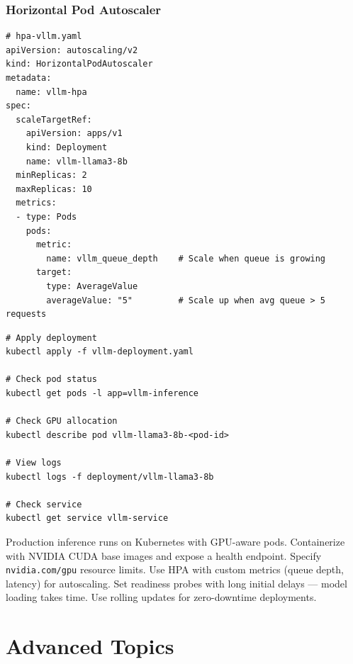 \documentclass[11pt, twoside, openright]{book}
\newenvironment{chapsummary}
  {\begin{tcolorbox}[enhanced, breakable,
    colback={rgb,255:red,245;green,245;blue,225},
    colframe=AccentOrange, boxrule=1.5pt, arc=4pt,
    title={\bfseries Chapter Summary},
    fonttitle=\bfseries\color{white},
    attach boxed title to top left={yshift=-2mm, xshift=5mm},
    boxed title style={colback=AccentOrange, arc=2pt}]}
  {\end{tcolorbox}}
\begin{document}
\section{Horizontal Pod Autoscaler}

\begin{lstlisting}[style=yamlstyle, caption={HPA based on custom latency metric}]
# hpa-vllm.yaml
apiVersion: autoscaling/v2
kind: HorizontalPodAutoscaler
metadata:
  name: vllm-hpa
spec:
  scaleTargetRef:
    apiVersion: apps/v1
    kind: Deployment
    name: vllm-llama3-8b
  minReplicas: 2
  maxReplicas: 10
  metrics:
  - type: Pods
    pods:
      metric:
        name: vllm_queue_depth    # Scale when queue is growing
      target:
        type: AverageValue
        averageValue: "5"         # Scale up when avg queue > 5 requests
\end{lstlisting}

\begin{lstlisting}[style=bashstyle, caption={Deploying to Kubernetes}]
# Apply deployment
kubectl apply -f vllm-deployment.yaml

# Check pod status
kubectl get pods -l app=vllm-inference

# Check GPU allocation
kubectl describe pod vllm-llama3-8b-<pod-id>

# View logs
kubectl logs -f deployment/vllm-llama3-8b

# Check service
kubectl get service vllm-service
\end{lstlisting}

\begin{chapsummary}
Production inference runs on Kubernetes with GPU-aware pods.  Containerize with
NVIDIA CUDA base images and expose a health endpoint.  Specify
\texttt{nvidia.com/gpu} resource limits.  Use HPA with custom metrics (queue
depth, latency) for autoscaling.  Set readiness probes with long initial delays
--- model loading takes time.  Use rolling updates for zero-downtime deployments.
\end{chapsummary}

\part{Advanced Topics}

\end{document}
